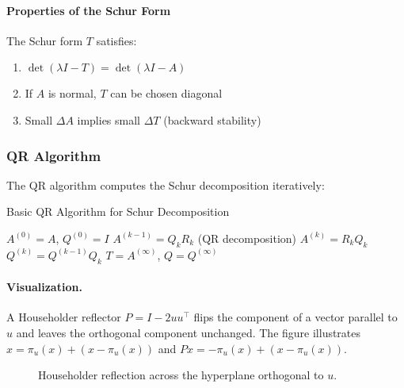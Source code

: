 \documentclass[../../main.tex]{subfiles}
\begin{document}
\paragraph{Properties of the Schur Form}
The Schur form $T$ satisfies:
\begin{enumerate}
    \item $\det(\lambda I - T) = \det(\lambda I - A)$
    \item If $A$ is normal, $T$ can be chosen diagonal
    \item Small $\Delta A$ implies small $\Delta T$ (backward stability)
\end{enumerate}

\subsubsection{QR Algorithm}

The QR algorithm computes the Schur decomposition iteratively:
\begin{algorithm}[ht]
    \caption{Basic QR Algorithm for Schur Decomposition}
    \label{alg:qr-schur}
    \begin{algorithmic}[1]
        \Require $A^{(0)} = A$, $Q^{(0)} = I$
        \State $A^{(k-1)} = Q_k R_k$ (QR decomposition)
        \State $A^{(k)} = R_k Q_k$
        \State $Q^{(k)} = Q^{(k-1)} Q_k$
        \EndFor
        \Ensure $T = A^{(\infty)}$, $Q = Q^{(\infty)}$
    \end{algorithmic}
\end{algorithm}

\paragraph{Visualization.} A Householder reflector $P=I-2uu^\top$ flips the component of a vector parallel to $u$ and leaves the orthogonal component unchanged. The figure illustrates $x=\pi_u(x)+(x-\pi_u(x))$ and $Px=-\pi_u(x)+(x-\pi_u(x))$.
\begin{figure}[H]
    \centering
    
    \caption{Householder reflection across the hyperplane orthogonal to $u$.}
\end{figure}
\end{document}
